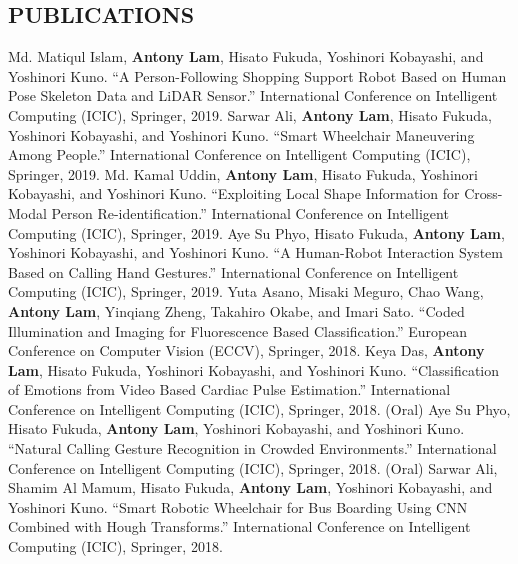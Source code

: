 \documentclass[letterpaper,10pt]{article}
\begin{document}
\subsection*{PUBLICATIONS}
Md. Matiqul Islam, \textbf{Antony Lam}, Hisato Fukuda, Yoshinori Kobayashi, and Yoshinori Kuno. ``A Person-Following Shopping Support Robot Based on Human Pose Skeleton Data and LiDAR Sensor.'' International Conference on Intelligent Computing (ICIC), Springer, 2019.\vspace{0.05in}\newline
Sarwar Ali, \textbf{Antony Lam}, Hisato Fukuda, Yoshinori Kobayashi, and Yoshinori Kuno. ``Smart Wheelchair Maneuvering Among People.'' International Conference on Intelligent Computing (ICIC), Springer, 2019.\vspace{0.05in}\newline
Md. Kamal Uddin, \textbf{Antony Lam}, Hisato Fukuda, Yoshinori Kobayashi, and Yoshinori Kuno. ``Exploiting Local Shape Information for Cross-Modal Person Re-identification.'' International Conference on Intelligent Computing (ICIC), Springer, 2019.\vspace{0.05in}\newline
Aye Su Phyo, Hisato Fukuda, \textbf{Antony Lam}, Yoshinori Kobayashi, and Yoshinori Kuno. ``A Human-Robot Interaction System Based on Calling Hand Gestures.'' International Conference on Intelligent Computing (ICIC), Springer, 2019.\vspace{0.05in}\newline
Yuta Asano, Misaki Meguro, Chao Wang, \textbf{Antony Lam}, Yinqiang Zheng, Takahiro Okabe, and Imari Sato. ``Coded Illumination and Imaging for Fluorescence Based Classification.'' European Conference on Computer Vision (ECCV), Springer, 2018.\vspace{0.05in}\newline
Keya Das, \textbf{Antony Lam}, Hisato Fukuda, Yoshinori Kobayashi, and Yoshinori Kuno. ``Classification of Emotions from Video Based Cardiac Pulse Estimation.'' International Conference on Intelligent Computing (ICIC), Springer, 2018. (Oral)\vspace{0.05in}\newline
Aye Su Phyo, Hisato Fukuda, \textbf{Antony Lam}, Yoshinori Kobayashi, and Yoshinori Kuno. ``Natural Calling Gesture Recognition in Crowded Environments.'' International Conference on Intelligent Computing (ICIC), Springer, 2018. (Oral)\vspace{0.05in}\newline
Sarwar Ali, Shamim Al Mamum, Hisato Fukuda, \textbf{Antony Lam}, Yoshinori Kobayashi, and Yoshinori Kuno. ``Smart Robotic Wheelchair for Bus Boarding Using CNN Combined with Hough Transforms.'' International Conference on Intelligent Computing (ICIC), Springer, 2018. \vspace{0.05in}\newline
\end{document}
